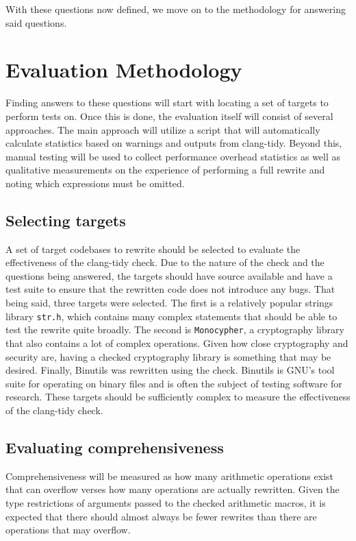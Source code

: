 With these questions now defined, we move on to the methodology for answering said questions.

\section{Evaluation Methodology}

Finding answers to these questions will start with locating a set of targets to perform tests on. Once this is done, the evaluation itself will consist of several approaches. The main approach will utilize a script that will automatically calculate statistics based on warnings and outputs from clang-tidy. Beyond this, manual testing will be used to collect performance overhead statistics as well as qualitative measurements on the experience of performing a full rewrite and noting which expressions must be omitted.

\subsection{Selecting targets}

A set of target codebases to rewrite should be selected to evaluate the effectiveness of the clang-tidy check. Due to the nature of the check and the questions being answered, the targets should have source available and have a test suite to ensure that the rewritten code does not introduce any bugs. That being said, three targets were selected. The first is a relatively popular strings library \texttt{str.h}, which contains many complex statements that should be able to test the rewrite quite broadly. The second is \texttt{Monocypher}, a cryptography library that also contains a lot of complex operations. Given how close cryptography and security are, having a checked cryptography library is something that may be desired. Finally, Binutils was rewritten using the check. Binutils is GNU's tool suite for operating on binary files and is often the subject of testing software for research. These targets should be sufficiently complex to measure the effectiveness of the clang-tidy check.

\subsection{Evaluating comprehensiveness}

Comprehensiveness will be measured as how many arithmetic operations exist that can overflow verses how many operations are actually rewritten. Given the type restrictions of arguments passed to the checked arithmetic macros, it is expected that there should almost always be fewer rewrites than there are operations that may overflow.

